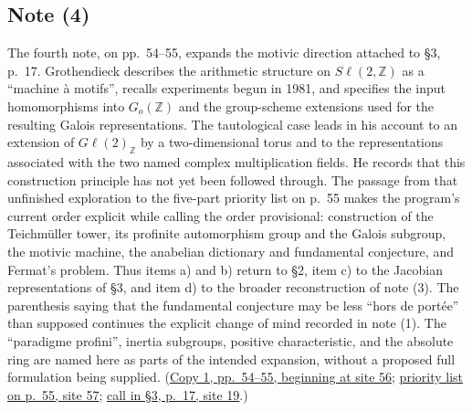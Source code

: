 \subsection*{Note (4)}
The fourth note, on pp.~54--55, expands the motivic direction attached to
\S3, p.~17. Grothendieck describes the arithmetic structure on
$S\ell(2,\mathbb Z)$ as a ``machine à motifs'', recalls experiments begun
in 1981, and specifies the input homomorphisms into $G_o(\mathbb Z)$ and
the group-scheme extensions used for the resulting Galois
representations. The tautological case leads in his account to an
extension of $G\ell(2)_{\mathbb Z}$ by a two-dimensional torus and to the
representations associated with the two named complex multiplication
fields. He records that this construction principle has not yet been
followed through. The passage from that unfinished exploration to the
five-part priority list on p.~55 makes the program's current order
explicit while calling the order provisional: construction of the
Teichmüller tower, its profinite automorphism group and the Galois
subgroup, the motivic machine, the anabelian dictionary and fundamental
conjecture, and Fermat's problem. Thus items a) and b) return to \S2,
item c) to the Jacobian representations of \S3, and item d) to the broader
reconstruction of note (3). The parenthesis saying that the fundamental
conjecture may be less ``hors de portée'' than supposed continues the
explicit change of mind recorded in note (1). The ``paradigme profini'',
inertia subgroups, positive characteristic, and the absolute ring are
named here as parts of the intended expansion, without a proposed full
formulation being supplied.
(\href{https://grothendieck.umontpellier.fr/web/viewer.html?file=../119.pdf\#page=57}{Copy 1, pp.~54--55, beginning at site 56};
\href{https://grothendieck.umontpellier.fr/web/viewer.html?file=../119.pdf\#page=58}{priority list on p.~55, site 57};
\href{https://grothendieck.umontpellier.fr/web/viewer.html?file=../119.pdf\#page=20}{call in \S3, p.~17, site 19}.)

